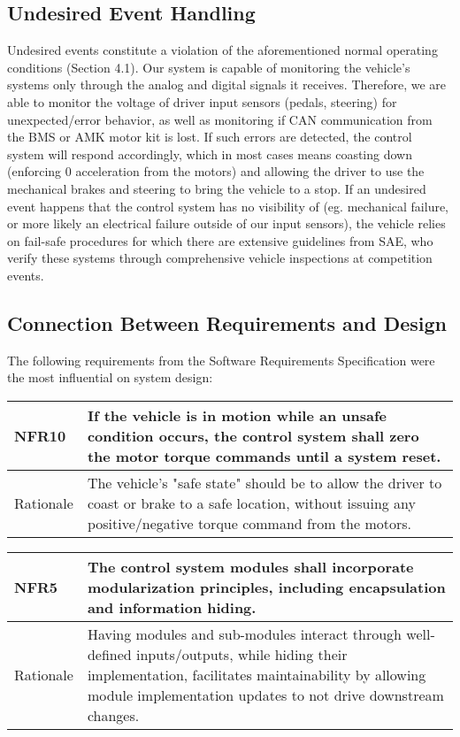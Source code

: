 \documentclass[12pt, titlepage]{article}
\newcommand{\tableVspace}{5mm}
\newcommand{\ReqColA}{0.13\textwidth}
\newcommand{\ReqColB}{0.82\textwidth}
\begin{document}
\subsection{Undesired Event Handling}

Undesired events constitute a violation of the aforementioned normal operating conditions (Section 4.1). Our system is capable of monitoring the vehicle's systems only through the analog and digital signals it receives. Therefore, we are able to monitor the voltage of driver input sensors (pedals, steering) for unexpected/error behavior, as well as monitoring if CAN communication from the BMS or AMK motor kit is lost. If such errors are detected, the control system will respond accordingly, which in most cases means coasting down (enforcing 0 acceleration from the motors) and allowing the driver to use the mechanical brakes and steering to bring the vehicle to a stop. If an undesired event happens that the control system has no visibility of (eg. mechanical failure, or more likely an electrical failure outside of our input sensors), the vehicle relies on fail-safe procedures for which there are extensive guidelines from SAE, who verify these systems through comprehensive vehicle inspections at competition events.

\subsection{Connection Between Requirements and Design} \label{SecConnection}

The following requirements from the Software Requirements Specification were the most influential on system design:

\vspace{\tableVspace}\noindent
\begin{tabular}{| p{\ReqColA} | p{\ReqColB}|}
\hline
\rowcolor[gray]{0.9}
NFR10 & If the vehicle is in motion while an unsafe condition occurs, the control system shall zero the motor torque commands until a system reset.\\
\hline
Rationale & The vehicle's "safe state" should be to allow the driver to coast or brake to a safe location, without issuing any positive/negative torque command from the motors.\\
\hline
\end{tabular}

\vspace{\tableVspace}\noindent
\begin{tabular}{| p{\ReqColA} | p{\ReqColB}|}
\hline
\rowcolor[gray]{0.9}
NFR5 & The control system modules shall incorporate modularization principles, including encapsulation and information hiding.\\
\hline
Rationale & Having modules and sub-modules interact through well-defined inputs/outputs, while hiding their implementation, facilitates maintainability by allowing module implementation updates to not drive downstream changes.  \\
\hline
\end{tabular}
\end{document}
